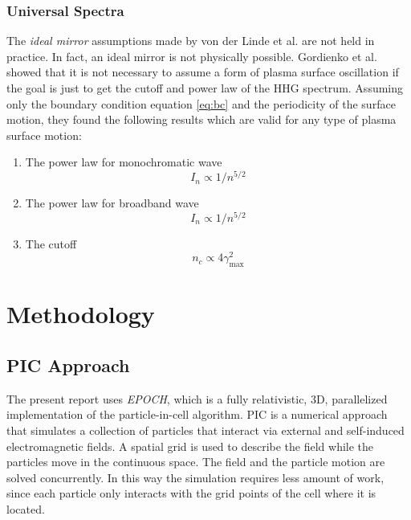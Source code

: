 \documentclass[12pt]{article}
\begin{document}
\subsubsection{Universal Spectra}
The \textit{ideal mirror} assumptions made by von der Linde et al.\cite{hhg-main} are not held in practice. In fact, an ideal mirror is not physically possible. Gordienko et al.\cite{universal-spectra} showed that it is not necessary to assume a form of plasma surface oscillation if the goal is just to get the cutoff and power law of the HHG spectrum. Assuming only the boundary condition equation \ref{eq:bc} and the periodicity of the surface motion, they found the following results which are valid for any type of plasma surface motion:
\begin{enumerate}
    \item The power law for monochromatic wave
          \begin{equation}
              \label{eq:power-law-u}
              I_n \propto 1/n^{5/2}
          \end{equation}
    \item The power law for broadband wave
          \begin{equation*}
              I_n \propto 1/n^{5/2}
          \end{equation*}
    \item The cutoff
          \begin{equation}
              \label{eq:cutoff-u}
              n_c \propto 4\gamma_{\max}^2
          \end{equation}
\end{enumerate}

\section{Methodology}
\subsection{PIC Approach}
The present report uses \textit{EPOCH}\cite{EPOCH}, which is a fully relativistic, 3D, parallelized implementation of the particle-in-cell algorithm. PIC is a numerical approach that simulates a collection of particles that interact via external and self-induced electromagnetic fields. A spatial grid is used to describe the field while the particles move in the continuous space. The field and the particle motion are solved concurrently. In this way the simulation requires less amount of work, since each particle only interacts with the grid points of the cell where it is located.
\end{document}
